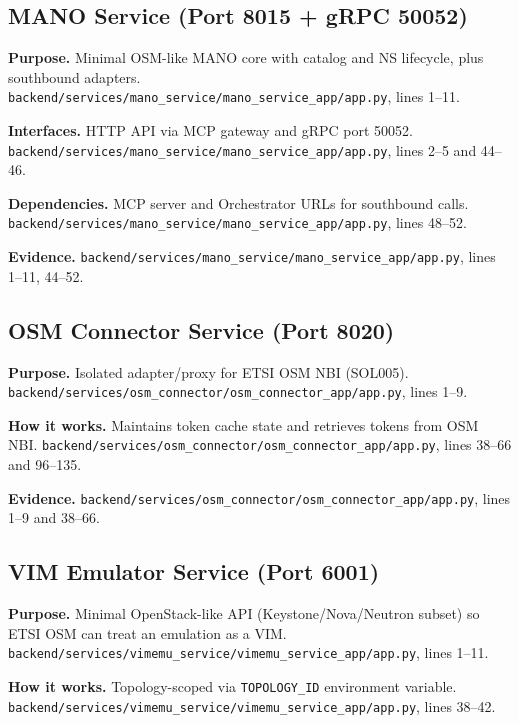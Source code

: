 \documentclass[10pt,a4paper]{article}
\begin{document}
\subsection{MANO Service (Port 8015 + gRPC 50052)}

\textbf{Purpose.} Minimal OSM-like MANO core with catalog and NS lifecycle, plus southbound adapters. \texttt{backend/services/mano\_service/mano\_service\_app/app.py}, lines 1--11.

\textbf{Interfaces.} HTTP API via MCP gateway and gRPC port 50052. \texttt{backend/services/mano\_service/mano\_service\_app/app.py}, lines 2--5 and 44--46.

\textbf{Dependencies.} MCP server and Orchestrator URLs for southbound calls. \texttt{backend/services/mano\_service/mano\_service\_app/app.py}, lines 48--52.

\textbf{Evidence.} \texttt{backend/services/mano\_service/mano\_service\_app/app.py}, lines 1--11, 44--52.

\subsection{OSM Connector Service (Port 8020)}

\textbf{Purpose.} Isolated adapter/proxy for ETSI OSM NBI (SOL005). \texttt{backend/services/osm\_connector/osm\_connector\_app/app.py}, lines 1--9.

\textbf{How it works.} Maintains token cache state and retrieves tokens from OSM NBI. \texttt{backend/services/osm\_connector/osm\_connector\_app/app.py}, lines 38--66 and 96--135.

\textbf{Evidence.} \texttt{backend/services/osm\_connector/osm\_connector\_app/app.py}, lines 1--9 and 38--66.

\subsection{VIM Emulator Service (Port 6001)}

\textbf{Purpose.} Minimal OpenStack-like API (Keystone/Nova/Neutron subset) so ETSI OSM can treat an emulation as a VIM. \texttt{backend/services/vimemu\_service/vimemu\_service\_app/app.py}, lines 1--11.

\textbf{How it works.} Topology-scoped via \texttt{TOPOLOGY\_ID} environment variable. \texttt{backend/services/vimemu\_service/vimemu\_service\_app/app.py}, lines 38--42.
\end{document}
